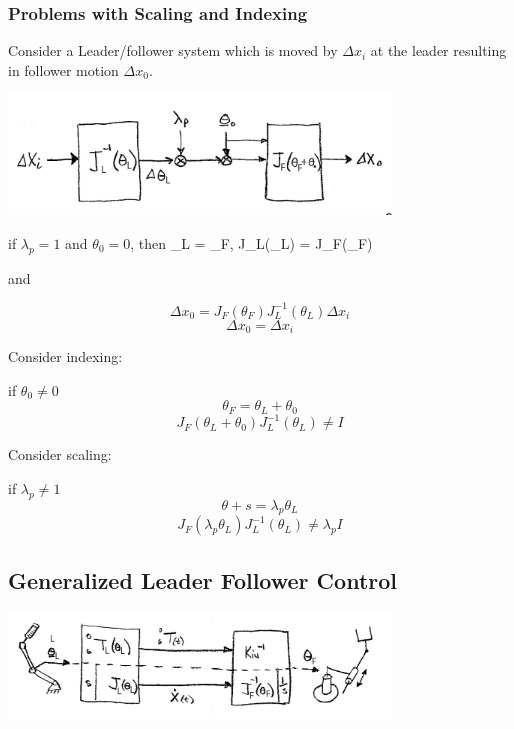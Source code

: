 \subsubsection{Problems with Scaling and Indexing}
Consider a Leader/follower system which is moved by $\Delta x_i$ at the leader resulting in follower motion $\Delta x_0$.

\includegraphics[width=4.0in]{figs14/00402.jpg}


if $\lambda_p =1$ and $\theta_0 = 0$, then
\bq
\theta_L = \theta_F, J_L(\theta_L) = J_F(\theta_F)
\eq

and

\[
\Delta x_0 = J_F(\theta_F)J^{-1}_L(\theta_L)\Delta x_i
\]
\[
\Delta x_0 = \Delta x_i
\]


Consider indexing:

if $\theta_0 \ne 0$
\[
\theta_F = \theta_L + \theta_0
\]
\[
J_F(\theta_L+\theta_0)J^{-1}_L(\theta_L) \ne I
\]


Consider scaling:

if $\lambda_p \ne 1$
\[
\theta+s = \lambda_p\theta_L
\]
\[
J_F(\lambda_p\theta_L)J^{-1}_L(\theta_L) \ne \lambda_p I
\]




\subsection{Generalized Leader Follower Control}

\includegraphics[width=4.0in]{figs14/00404.jpg}


